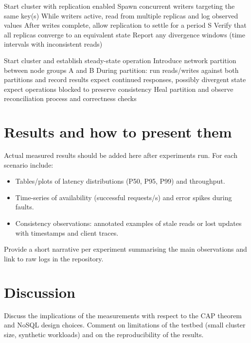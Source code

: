 \documentclass{article}
\begin{document}
\begin{algorithm}
\caption{Consistency Test}
\begin{algorithmic}[1]
\State Start cluster with replication enabled
\State Spawn concurrent writers targeting the same key(s)
\State While writers active, read from multiple replicas and log observed values
\State After writes complete, allow replication to settle for a period S
\State Verify that all replicas converge to an equivalent state
\State Report any divergence windows (time intervals with inconsistent reads)
\end{algorithmic}
\end{algorithm}

\begin{algorithm}
\caption{Partitioning Test}
\begin{algorithmic}[1]
\State Start cluster and establish steady-state operation
\State Introduce network partition between node groups A and B
\State During partition: run reads/writes against both partitions and record results
    \State expect continued responses, possibly divergent state
\Else
    \State expect operations blocked to preserve consistency
\EndIf
\State Heal partition and observe reconciliation process and correctness checks
\end{algorithmic}
\end{algorithm}


\section{Results and how to present them}
Actual measured results should be added here after experiments run. For each scenario include:
\begin{itemize}
    \item Tables/plots of latency distributions (P50, P95, P99) and throughput.
    \item Time-series of availability (successful requests/s) and error spikes during faults.
    \item Consistency observations: annotated examples of stale reads or lost updates with timestamps and client traces.
\end{itemize}

Provide a short narrative per experiment summarising the main observations and link to raw logs in the repository.

\section{Discussion}
Discuss the implications of the measurements with respect to the CAP theorem and NoSQL design choices. Comment on limitations of the testbed (small cluster size, synthetic workloads) and on the reproducibility of the results.
\end{document}
